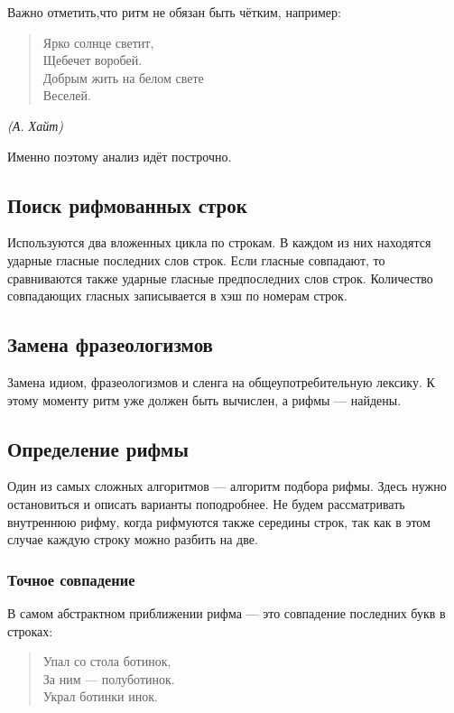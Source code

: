 Важно отметить,что ритм не обязан быть чётким, например:

\begin{verse}
Ярко солнце светит,\\
Щебечет воробей.\\
Добрым жить на белом свете\\
Веселей.
\end{verse}
\hskip 6cm \textit{(А. Хайт)}

Именно поэтому анализ идёт построчно.

\subsection{Поиск рифмованных строк}

Используются два вложенных цикла по строкам. В каждом из них находятся ударные гласные последних слов строк. Если гласные совпадают, то сравниваются также ударные гласные предпоследних слов строк. Количество совпадающих гласных записывается в хэш по номерам строк.

\subsection{Замена фразеологизмов}
Замена идиом, фразеологизмов и сленга на общеупотребительную лексику. К этому моменту ритм уже должен быть вычислен, а рифмы — найдены.

\subsection{Определение рифмы}

Один из самых сложных алгоритмов --- алгоритм подбора рифмы. Здесь нужно остановиться и описать варианты поподробнее. Не будем рассматривать внутреннюю рифму, когда рифмуются также середины строк, так как в этом случае каждую строку можно разбить на две.

\subsubsection{Точное совпадение}

В самом абстрактном приближении рифма --- это совпадение последних букв в строках:

\begin{verse}
Упал со стола ботинок,\\
За ним --- полуботинок.\\
Украл ботинки инок.
\end{verse}

